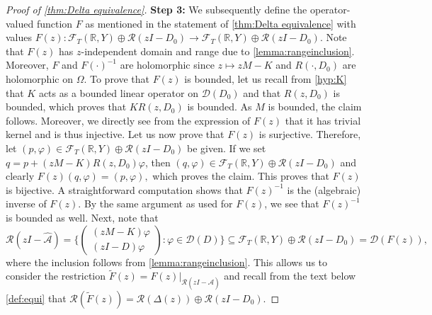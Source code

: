 \documentclass[english]{myarticle}
\begin{document}
\begin{sloppypar}
\begin{proof}[Proof of \cref{thm:Delta equivalence}]
\textbf{Step 3:} We subsequently define the operator-valued function $F$ as mentioned in the statement of \cref{thm:Delta equivalence} with values $F(z) : \mathcal{F}_T(\mathbb{R},Y) \oplus \mathcal{R}(zI-D_0) \to \mathcal{F}_T(\mathbb{R},Y) \oplus \mathcal{R}(zI-D_0)$. Note that $F(z)$ has $z$-independent domain and range due to \cref{lemma:rangeinclusion}. Moreover, $F$ and $F(\cdot)^{-1}$ are holomorphic since $z \mapsto zM-K$ and $R(\cdot,D_0)$ are holomorphic on $\Omega$. To prove that $F(z)$ is bounded, let us recall from  \ref{hyp:K} that $K$ acts as a bounded linear operator on $\mathcal{D}(D_0)$ and that $R(z, D_0)$ is bounded, which proves that $KR(z,D_0)$ is bounded. As $M$ is bounded, the claim follows. Moreover, we directly see from the expression of $F(z)$ that it has trivial kernel and is thus injective. Let us now prove that $F(z)$ is surjective. Therefore, let $(p,\varphi) \in \mathcal{F}_T(\mathbb{R},Y) \oplus \mathcal{R}(zI-D_0)$ be given. If we set $q = p + (zM-K)R(z,D_0)\varphi$, then $(q,\varphi) \in \mathcal{F}_T(\mathbb{R},Y) \oplus \mathcal{R}(zI-D_0)$ and clearly $F(z)(q,\varphi) = (p,\varphi),$ which proves the claim. This proves that $F(z)$ is bijective. A straightforward computation shows that $F(z)^{-1}$ is the (algebraic) inverse of $F(z)$. By the same argument as used for $F(z)$, we see that $F(z)^{-1}$ is bounded as well. Next, note that
\begin{equation*}
    \mathcal{R}(zI-\hat{\mathcal{A}}) = \bigg \{
    \begin{pmatrix}
        (zM-K)\varphi \\
        (zI-D)\varphi 
    \end{pmatrix}: \varphi \in \mathcal{D}(D) \bigg \} \subseteq  \mathcal{F}_T(\mathbb{R},Y) \oplus \mathcal{R}(zI-D_0) = \mathcal{D}(F(z)),
\end{equation*}
where the inclusion follows from \cref{lemma:rangeinclusion}. This allows us to consider the restriction $\tilde{F}(z) = F(z)|_{\mathcal{R}(zI-\hat{\mathcal{A}})}$ and recall from the text below \cref{def:equi} that $\mathcal{R}(\tilde{F}(z)) = \mathcal{R}(\Delta(z)) \oplus \mathcal{R}(zI-D_0)$.


\end{proof}
\end{sloppypar}
\end{document}

